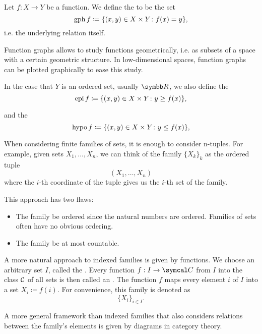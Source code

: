 \begin{definition}\label{def:function_graph}
  Let \( f: X \to Y \) be a function. We define the  to be the set
  \begin{equation*}
    \operatorname{gph} f \coloneqq \{ (x, y) \in X \times Y \colon f(x) = y \},
  \end{equation*}
  i.e. the underlying relation itself.

  Function graphs allows to study functions geometrically, i.e. as subsets of a space with a certain geometric structure. In low-dimensional spaces, function graphs can be plotted graphically to ease this study.

  In the case that \( Y \) is an ordered set, usually \( \R \), we also define the 
  \begin{equation*}
    \operatorname{epi} f \coloneqq \{ (x, y) \in X \times Y \colon y \geq f(x) \},
  \end{equation*}

  and the 
  \begin{equation*}
    \operatorname{hypo} f \coloneqq \{ (x, y) \in X \times Y \colon y \leq f(x) \},
  \end{equation*}
\end{definition}

\begin{definition}\label{def:indexed_family}
  When considering finite families of sets, it is enough to consider n-tuples. For example, given sets \( X_1, \ldots, X_n \), we can think of the family \( \{ X_k \}_k \) as the ordered tuple
  \begin{equation*}
    (X_1, \ldots, X_n)
  \end{equation*}
  where the \( i \)-th coordinate of the tuple gives us the \( i \)-th set of the family.

  This approach has two flaws:
  \begin{itemize}
    \item The family  be ordered since the natural numbers are ordered. Families of sets often have no obvious ordering.
    \item The family  be at most countable.
  \end{itemize}

  A more natural approach to indexed families is given by functions. We choose an arbitrary set \( I \), called the . Every function \( f: I \to \Cal C \) from \( I \) into the class \( \cal C \) of all sets is then called an . The function \( f \) maps every element \( i \) of \( I \) into a set \( X_i \coloneqq f(i) \). For convenience, this family is denoted as
  \begin{equation*}
    \{ X_i \}_{i \in I}.
  \end{equation*}

  A more general framework than indexed families that also considers relations between the family's elements is given by diagrams in category theory.
\end{definition}

